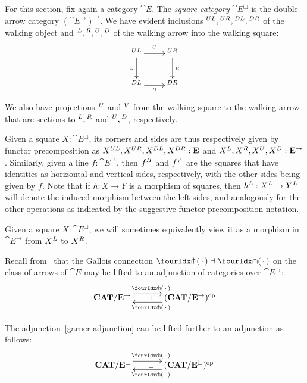 \documentclass[reqno,10pt,a4paper,oneside]{amsart}
\begin{document}
For this section, fix again a category $\cat{E}$.
The \emph{square category} $\cat{E}^{\Box}$ is the double arrow category $(\cat{E}^{\to})^{\to}$.
We have evident inclusions ${}^{UL}, {}^{UR}, {}^{DL}, {}^{DR}$ of the walking object and ${}^L, {}^R, {}^U, {}^D$ of the walking arrow into the walking square:
\[
\xymatrix{
  \squl
  \ar[r]^{\squ}
  \ar[d]_{\sql}
  \ar@{}[dr]
&
  \squr
  \ar[d]^{\sqr}
\\
  \sqdl
  \ar[r]_{\sqd}
&
  \sqdr
}
\]
We also have projections ${}^{H}$ and ${}^{V}$ from the walking square to the walking arrow that are sections to ${}^L, {}^R$ and ${}^U, {}^D$, respectively.

Given a square $X : \cat{E}^{\Box}$, its corners and sides are thus respectively given by functor precomposition as $X{}^{UL}, X{}^{UR}, X{}^{DL}, X{}^{DR} : \mathbf{E}$ and $X{}^L, X{}^R, X{}^U, X{}^D : \mathbf{E}^{\to}$.
Similarly, given a line $f : \cat{E}^{\to}$, then $f{}^{H}$ and $f{}^{V}$ are the squares that have identities as horizontal and vertical sides, respectively, with the other sides being given by $f$.
Note that if $h : X \to Y$ is a morphism of squares, then \eg $h{}^L : X{}^L \to Y{}^L$ will denote the induced morphism between the left sides, and analogously for the other operations as indicated by the suggestive functor precomposition notation.

Given a square $X : \cat{E}^{\Box}$, we will sometimes equivalently view it as a morphism in $\cat{E}^{\to}$ from $X{}^L$ to $X{}^R$.

Recall from~\cite{garner:small-object-argument} that the Gallois connection $\liftl{\brarghole} \dashv \liftr{\brarghole}$ on the class of arrows of $\cat{E}$ may be lifted to an adjunction of categories over $\cat{E}^{\to}$:
\begin{equation}
\label{garner-adjunction}
\begin{gathered}
\xymatrix@C+1em{
  \CAT/\cat{E}^{\to}
  \ar@<5pt>[r]^{\liftl{\brarghole}}
  \ar@{}[r]|{\bot}
&
  (\CAT/\cat{E}^{\to})^{\op}
  \ar@<5pt>[l]^{\liftr{\brarghole}}
}
\end{gathered}
\end{equation}

\begin{lemma}
\label{garner-adjunction-extended}
The adjunction~\eqref{garner-adjunction} can be lifted further to an adjunction as follows:
\begin{equation}
\label{garner-adjunction-extended}
\begin{gathered}
\xymatrix@C+1em{
  \CAT/\cat{E}^{\Box}
  \ar@<5pt>[r]^{\liftl{\brarghole}}
  \ar@{}[r]|{\bot}
&
  (\CAT/\cat{E}^{\Box})^{\op}
  \ar@<5pt>[l]^{\liftr{\brarghole}}
}
\end{gathered}
\end{equation}
\end{lemma}
\end{document}
